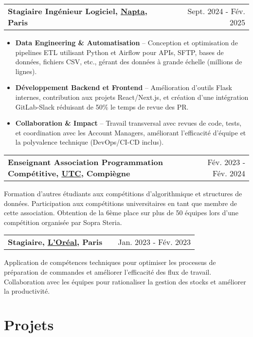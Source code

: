\documentclass[a4paper,10pt]{article}
\makeatletter
\newenvironment{jobshort}[2]
    {
    \begin{tabularx}{\linewidth}{@{}l X r@{}}
    \textbf{#1} & \hfill &  #2 \\[2pt]
    \end{tabularx}
    } {}
\newenvironment{joblong}[2]
    {
    \begin{tabularx}{\linewidth}{@{}l X r@{}}
    \textbf{#1} & \hfill &  #2 \\[2pt]
    \end{tabularx}
    \begin{minipage}[t]{\linewidth}
    \begin{itemize}[nosep,after=\strut, leftmargin=1em, itemsep=3pt,label=--]
    }
    {
    \end{itemize}
    \end{minipage}    
    }
\makeatother
\begin{document}
\begin{joblong}{Stagiaire Ingénieur Logiciel, \href{https://www.napta.io}{Napta}, Paris}{Sept. 2024 - Fév. 2025}
    \item \textbf{Data Engineering \& Automatisation} – Conception et optimisation de pipelines ETL utilisant Python et Airflow pour APIs, SFTP, bases de données, fichiers CSV, etc., gérant des données à grande échelle (millions de lignes).
    \item \textbf{Développement Backend et Frontend} – Amélioration d'outils Flask internes, contribution aux projets React/Next.js, et création d'une intégration GitLab-Slack réduisant de 50\% le temps de revue des PR.
    \item \textbf{Collaboration \& Impact} – Travail transversal avec revues de code, tests, et coordination avec les Account Managers, améliorant l'efficacité d'équipe et la polyvalence technique (DevOps/CI-CD inclus).
\end{joblong}

\begin{jobshort}{Enseignant Association Programmation Compétitive, \href{https://www.utc.fr}{UTC}, Compiègne}{Fév. 2023 - Fév. 2024}
    Formation d'autres étudiants aux compétitions d'algorithmique et structures de données. Participation aux compétitions universitaires en tant que membre de cette association. Obtention de la 6ème place sur plus de 50 équipes lors d'une compétition organisée par Sopra Steria.
\end{jobshort}

\begin{jobshort}{Stagiaire, \href{https://www.loreal.com}{L'Oréal}, Paris}{Jan. 2023 - Fév. 2023}
    Application de compétences techniques pour optimiser les processus de préparation de commandes et améliorer l'efficacité des flux de travail. Collaboration avec les équipes pour rationaliser la gestion des stocks et améliorer la productivité.
\end{jobshort}

\section{Projets}
\end{document}
